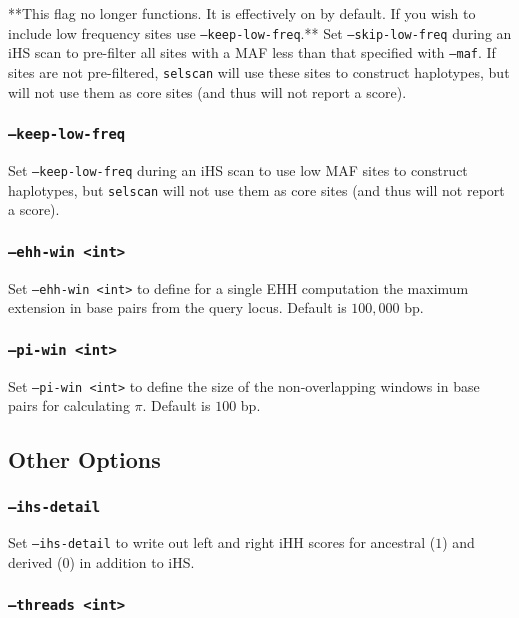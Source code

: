 \documentclass[12pt]{article}%
\begin{document}
**This flag no longer functions.  It is effectively on by default.  If you wish to include low frequency sites use {\tt --keep-low-freq}.** Set {\tt --skip-low-freq} during an iHS scan to pre-filter all sites with a MAF less than that specified with {\tt --maf}.  If sites are not pre-filtered, {\tt selscan} will use these sites to construct haplotypes, but will not use them as core sites (and thus will not report a score).

\subsubsection{{\tt --keep-low-freq}}

Set {\tt --keep-low-freq} during an iHS scan to use low MAF sites to construct haplotypes, but {\tt selscan} will not use them as core sites (and thus will not report a score).

\subsubsection{{\tt --ehh-win <int>}}

Set {\tt --ehh-win <int>} to define for a single EHH computation the maximum extension in base pairs from the query locus.  Default is $100,000$ bp.

\subsubsection{{\tt --pi-win <int>}}

Set {\tt --pi-win <int>} to define the size of the non-overlapping windows in base pairs for calculating $\pi$.  Default is $100$ bp.


\subsection{Other Options}

\subsubsection{{\tt --ihs-detail}}

Set {\tt--ihs-detail} to write out left and right iHH scores for ancestral ($1$) and derived ($0$) in addition to iHS.

\subsubsection{{\tt --threads <int>}}
\end{document}

